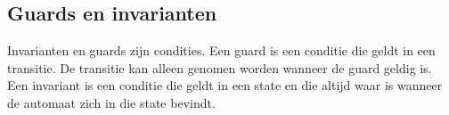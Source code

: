 \documentclass{article}
\begin{document}
	\subsection{Guards en invarianten}
	
	Invarianten en guards zijn condities.
		Een guard is een conditie die geldt in een transitie.   De
	transitie kan alleen genomen worden wanneer de guard geldig
	is.
	Een invariant is een conditie die geldt in een state en die altijd
	waar is wanneer de automaat zich in die state bevindt.

 
	
	
\end{document}
